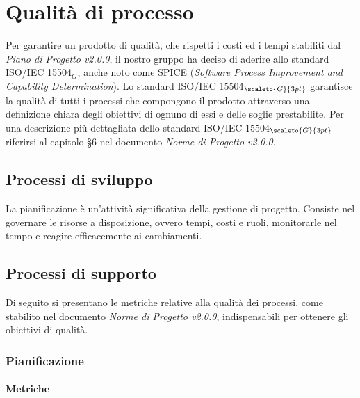 \chapter{Qualità di processo}\label{QualitàDelProcesso}
Per garantire un prodotto di qualità, che rispetti i costi ed i tempi stabiliti dal \textit{Piano di Progetto v2.0.0}, il nostro gruppo ha deciso di aderire allo standard ISO/IEC 15504$_G$, anche noto come SPICE (\textit{Software Process Improvement and Capability Determination}).
Lo standard ISO/IEC 15504$_{\scaleto{G}{3pt}}$ garantisce la qualità di tutti i processi che compongono il prodotto attraverso una definizione chiara degli obiettivi di ognuno di essi e delle soglie prestabilite.
Per una descrizione più dettagliata dello standard ISO/IEC 15504$_{\scaleto{G}{3pt}}$
riferirsi al capitolo §6 nel documento \textit{Norme di Progetto v2.0.0}.
\section{Processi di sviluppo}\label{QualitàDelProcessoProcessoDiPianificazione}
La pianificazione è un’attività significativa della gestione di progetto.
Consiste nel governare le risorse a disposizione, ovvero tempi, costi e ruoli, monitorarle nel tempo e reagire efficacemente ai cambiamenti.

\section{Processi di supporto}\label{QualitàDelProcessoProcessiDiSupporto}
Di seguito si presentano le metriche relative alla qualità dei processi, come stabilito nel
documento \textit{Norme di Progetto v2.0.0}, indispensabili per ottenere gli obiettivi di qualità.
\subsection{Pianificazione}\label{QualitàDelProcessoProcessiDiSupportoPianificazione}
\subsubsection{Metriche}\label{MetricheProcessiDiSupporto}

